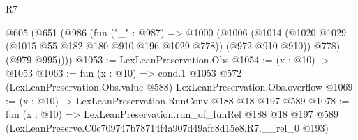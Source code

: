 \begin{lexlean}{R7}
\begin{coremodule}
  @605
    (@651
      (@986
        (fun ("_" : @987) =>
        @1000
          (@1006
            (@1014 (@1020 @1029 (@1015 @55 @182 @180 @910 @196 @1029 @778)) (@972 @910 @910))
            @778)
          (@979 @995))))
@1053 := LexLeanPreservation.Obs
@1054 := (x : @10) -> @1053
@1063 := fun (x : @10) =>
  cond.{1} @1053 @572 (LexLeanPreservation.Obs.value @588) LexLeanPreservation.Obs.overflow
@1069 := (x : @10) -> LexLeanPreservation.RunConv @188 @18 @197 @589
@1078 := fun (x : @10) =>
  LexLeanPreservation.run_of_funRel
    @188
    @18
    @197
    @589
    (LexLeanPreserve.C0e709747b78714f4a907d49afc8d15e8.R7.__rel_0 @193)
\end{coremodule}
\end{lexlean}
